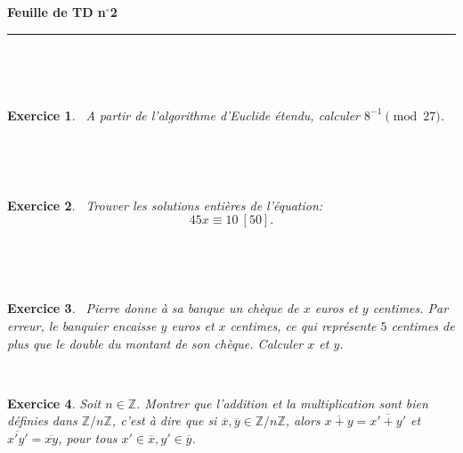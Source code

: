 \documentclass[11pt,a4paper]{article}
\title{}
\date{}
\newtheorem{ex}{Exercice}
\newcommand{\HRule}{\rule{\linewidth}{0.5mm}}
\newcommand{\Z}{\mathbb{Z}}
\begin{document}
\pagestyle{fancy}

\fancyhead{}
 \fancyfoot{}


\newcommand{\lb}{\llbracket}
\newcommand{\rb}{\rrbracket}


\newcommand{\md}[3]{#1\ \equiv \ #2 \! \! \! \! \! \pmod {#3} }
\newcommand{\nmd}[3]{#1 \not \equiv #2 \! \! \! \! \!  \pmod {#3} }
\newcommand{\mda}[3]{#1 \equiv #2 \! \!  \pmod {#3} }
\newcommand{\nmda}[3]{#1 \not \equiv #2 \! \! \pmod {#3} }
\newcommand{\mo}[2]{#1 \! \! \! \! \! \pmod #2 }
\newcommand{\moa}[2]{#1 \! \!  \pmod {#2} }


\thispagestyle{fancy}

\begin{center}
    { \huge \bfseries
    Feuille de TD n$^{\boldsymbol{\circ}}$2
     \\ [0cm] }
    \HRule \\[0.5cm]
\end{center}


\

\begin{ex}\
A partir de l'algorithme d'Euclide étendu, calculer $\moa{8^{-1}}{27}$.
\end{ex}


\

\

\begin{ex}\
Trouver les solutions entières de l'équation:
$$  {45x}\equiv {10}\  [{50}].    $$
\end{ex}



\

\



\begin{ex}\
Pierre donne à sa banque un chèque de $x$ euros et $y$ centimes. Par erreur, le banquier encaisse $y$ euros et $x$ centimes, ce qui représente $5$ centimes de plus que le double du montant de son chèque. Calculer $x$ et $y$.
\end{ex}

\

\begin{ex}
Soit $n\in \Z$. Montrer que l'addition et la multiplication sont bien définies dans $\Z/n\Z$, c'est  à dire que si $\overline{x},\overline{y}\in \Z/n\Z$, alors $\overline{x+y}=\overline{x'+y'}$ et $\overline{x'y'}=\overline{xy}$, pour tous $x'\in \overline{x}, y'\in \overline{y}$. 
\end{ex}
\end{document}
